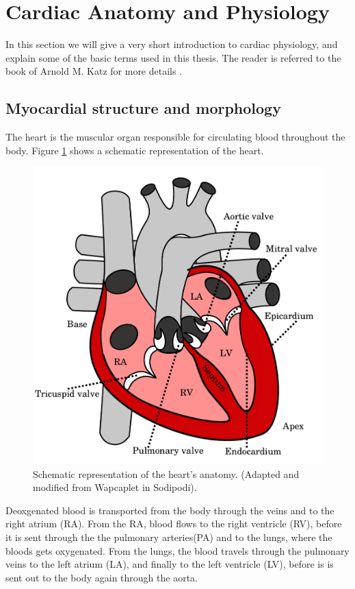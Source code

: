 \section{Cardiac Anatomy and Physiology}
\label{sec:intro_physiology}
In this section we will give a very short introduction to cardiac
physiology, and explain some of the basic terms used in this
thesis. The reader is referred to the book of Arnold M. Katz for 
more details \cite{katz2010physiology}.


\subsection{Myocardial structure and morphology}
The heart is the muscular organ responsible for circulating blood
throughout the body. Figure \ref{fig:heart_anatomy} shows a schematic
representation of the heart. 


\begin{figure}[htbp]
  \centering
    \includegraphics{chapters/introduction/figures/heart_anatomy}
\caption{Schematic representation of the heart's anatomy. (Adapted and modified from Wapcaplet in Sodipodi).}
\label{fig:heart_anatomy}
\end{figure}


Deoxgenated blood is transported from the body through the veins and to
the right atrium (RA). From the RA, blood flows to the right ventricle
(RV), before it is sent through the the pulmonary arteries(PA) and to the
lungs, where the bloods gets oxygenated. From the lungs, the blood
travels through the pulmonary veins to the left atrium (LA), and
finally to the left ventricle (LV), before is is sent out to the body
again through the aorta.

